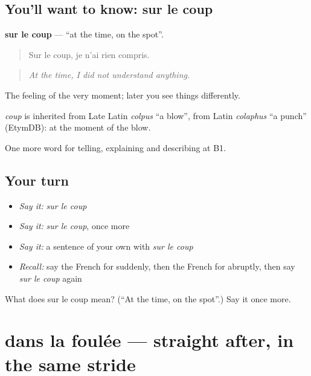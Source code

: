 \subsection*{You'll want to know: sur le coup}
\textbf{sur le coup} — \textquotedblleft{}at the time, on the spot\textquotedblright{}.

\begin{quote}
Sur le coup, je n'ai rien compris.
\end{quote}

\begin{quote}
\emph{At the time, I did not understand anything.}
\end{quote}

The feeling of the very moment; later you see things differently.

\begin{cousinweb}
\emph{coup} is inherited from Late Latin \emph{colpus} \textquotedblleft{}a blow\textquotedblright{}, from Latin \emph{colaphus} \textquotedblleft{}a punch\textquotedblright{} (EtymDB): at the moment of the blow.
\end{cousinweb}

\begin{grammarlens}[title={What you've built}]
One more word for telling, explaining and describing at B1.
\end{grammarlens}

\subsection*{Your turn}
\begin{itemize}
\raggedright
  \item \emph{Say it:} \emph{sur le coup}
  \item \emph{Say it:} \emph{sur le coup}, once more
  \item \emph{Say it:} a sentence of your own with \emph{sur le coup}
  \item \emph{Recall:} say the French for suddenly, then the French for abruptly, then say \emph{sur le coup} again
\end{itemize}

\begin{tcolorbox}[breakable,colback=teal!4,colframe=teal!35!black,title={Before you move on}]
What does sur le coup mean? (\textquotedblleft{}At the time, on the spot\textquotedblright{}.) Say it once more.
\end{tcolorbox}
\section[dans la foulée]{dans la foulée — straight after, in the same stride}

